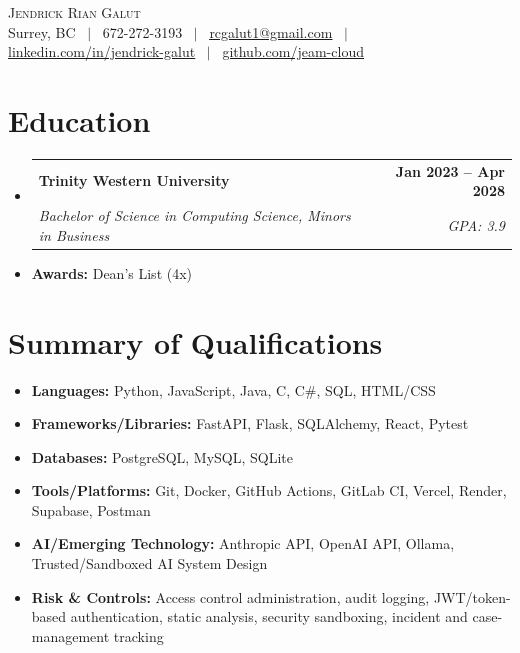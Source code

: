 \documentclass[letterpaper,10pt]{article}
\makeatletter
\newcommand{\resumeSkill}[1]{\item[]\small{#1 \vspace{-2pt}}}
\newcommand{\resumeSubheading}[4]{%
  \vspace{-2pt}\item[]
    \begin{tabular*}{1.0\textwidth}[t]{l@{\extracolsep{\fill}}r}
      \textbf{#1} & \textbf{\small #2} \\
      \textit{\small #3} & \textit{\small #4} \\
    \end{tabular*}\vspace{-4pt}
}
\newcommand{\resumeSubHeadingListStart}{\begin{itemize}[leftmargin=0in, itemsep=0pt]}
\newcommand{\resumeSubHeadingListEnd}{\end{itemize}}
\makeatother
\begin{document}
\begin{center}
    {\LARGE \scshape Jendrick Rian Galut} \\ \vspace{1pt}
    \small Surrey, BC ~$|$~
    672-272-3193 ~$|$~
    \href{mailto:rcgalut1@gmail.com}{\underline{rcgalut1@gmail.com}} ~$|$~
    \href{https://www.linkedin.com/in/jendrick-rian-galut-374310307/}{\underline{linkedin.com/in/jendrick-galut}} ~$|$~
    \href{https://github.com/Jeam-cloud}{\underline{github.com/jeam-cloud}}
    \vspace{-5pt}
\end{center}
\section{Education}
\resumeSubHeadingListStart
    \resumeSubheading
      {Trinity Western University}{Jan 2023 -- Apr 2028}
      {Bachelor of Science in Computing Science, Minors in Business}{GPA: 3.9}
    \item[] \small \textbf{Awards:} Dean's List (4x)
\resumeSubHeadingListEnd
\vspace{-14pt}
\section{Summary of Qualifications}
\resumeSubHeadingListStart
    \resumeSkill{\textbf{Languages:} Python, JavaScript, Java, C, C\#, SQL, HTML/CSS}
    \resumeSkill{\textbf{Frameworks/Libraries:} FastAPI, Flask, SQLAlchemy, React, Pytest}
    \resumeSkill{\textbf{Databases:} PostgreSQL, MySQL, SQLite}
    \resumeSkill{\textbf{Tools/Platforms:} Git, Docker, GitHub Actions, GitLab CI, Vercel, Render, Supabase, Postman}
    \resumeSkill{\textbf{AI/Emerging Technology:} Anthropic API, OpenAI API, Ollama, Trusted/Sandboxed AI System Design}
    \resumeSkill{\textbf{Risk \& Controls:} Access control administration, audit logging, JWT/token-based authentication, static analysis, security sandboxing, incident and case-management tracking}
\resumeSubHeadingListEnd
\vspace{-14pt}
\end{document}
